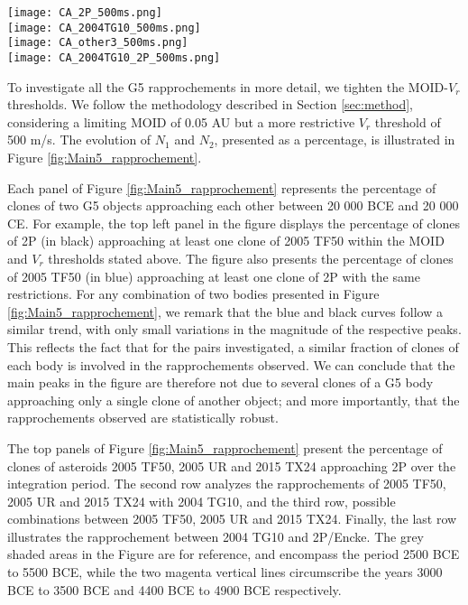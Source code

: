 \documentclass[letters,a4paper,fleqn,usenatbib]{mnras}
\begin{document}
 \begin{figure*}
  \centering
  \texttt{[image: CA\_2P\_500ms.png]}\\
  \texttt{[image: CA\_2004TG10\_500ms.png]}\\
  \texttt{[image: CA\_other3\_500ms.png]}\\
  \texttt{[image: CA\_2004TG10\_2P\_500ms.png]}\\
   \caption{Percentage of clones of body \#1 (in blue) and body \#2 (in black) approaching at least a clone of the other object with a MOID smaller than 0.05 AU and a relative velocity below 500 m/s. The grey shaded areas encompasses the period 2500 BCE to 5500 BCE, and the two magenta areas the years 3000 BCE to 3500 BCE and 4400 BCE to 4900 BCE respectively. }
   \label{fig:Main5_rapprochement}
 \end{figure*}
 
 To investigate all the G5 rapprochements in more detail, we tighten the MOID-$V_r$ thresholds.  We follow the methodology described in Section \ref{sec:method}, considering a limiting MOID of 0.05 AU but a more restrictive $V_r$ threshold of 500 m/s. The evolution of $N_1$ and $N_2$, presented as a percentage, is illustrated in Figure \ref{fig:Main5_rapprochement}. 
 
 Each panel of Figure \ref{fig:Main5_rapprochement} represents the percentage of clones of two G5 objects approaching each other between 20 000 BCE and 20 000 CE. For example, the top left panel in the figure displays the percentage of clones of 2P (in black) approaching at least one clone of 2005 TF50 within the MOID and $V_r$ thresholds stated above. The figure also presents the percentage of clones of 2005 TF50 (in blue) approaching at least one clone of 2P with the same restrictions. For any combination of two bodies presented in Figure \ref{fig:Main5_rapprochement}, we remark that the blue and black curves follow a similar trend, with only small variations in the magnitude of the respective peaks. This reflects the fact that for the pairs investigated, a similar fraction of clones of each body is involved in the rapprochements observed. We can conclude that the main peaks in the figure are therefore not due to several clones of a G5 body approaching only a single clone of another object; and more importantly, that the rapprochements observed are statistically robust.
 
 The top panels of Figure \ref{fig:Main5_rapprochement} present the percentage of clones of asteroids 2005 TF50, 2005 UR and 2015 TX24 approaching 2P over the integration period. The second row analyzes the rapprochements of 2005 TF50, 2005 UR and 2015 TX24 with 2004 TG10, and the third row, possible combinations between 2005 TF50, 2005 UR and 2015 TX24. Finally, the last row illustrates the rapprochement between 2004 TG10 and 2P/Encke. The grey shaded areas in the Figure are for reference, and encompass the period 2500 BCE to 5500 BCE, while the two magenta vertical lines circumscribe the years 3000 BCE to 3500 BCE and 4400 BCE to 4900 BCE respectively. 
 
\end{document}
